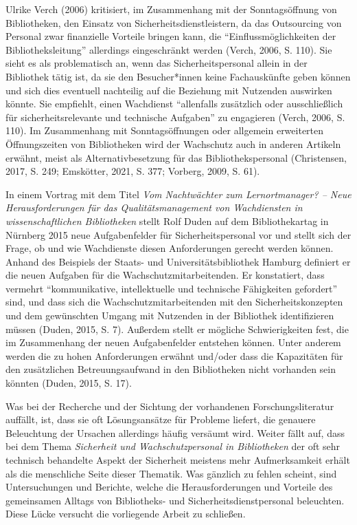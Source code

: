 \documentclass[a4paper,
fontsize=11pt,
oneside,
numbers=noperiodatend,
parskip=half-,
bibliography=totoc,
final
]{scrartcl}
\begin{document}
Ulrike Verch (2006) kritisiert, im Zusammenhang mit der Sonntagsöffnung
von Bibliotheken, den Einsatz von Sicherheitsdienstleistern, da das
Outsourcing von Personal zwar finanzielle Vorteile bringen kann, die
\enquote{Einflussmöglichkeiten der Bibliotheksleitung} allerdings
eingeschränkt werden (Verch, 2006, S. 110). Sie sieht es als
problematisch an, wenn das Sicherheitspersonal allein in der Bibliothek
tätig ist, da sie den Besucher*innen keine Fachauskünfte geben können
und sich dies eventuell nachteilig auf die Beziehung mit Nutzenden
auswirken könnte. Sie empfiehlt, einen Wachdienst \enquote{allenfalls
zusätzlich oder ausschließlich für sicherheitsrelevante und technische
Aufgaben} zu engagieren (Verch, 2006, S. 110). Im Zusammenhang mit
Sonntagsöffnungen oder allgemein erweiterten Öffnungszeiten von
Bibliotheken wird der Wachschutz auch in anderen Artikeln erwähnt, meist
als Alternativbesetzung für das Bibliothekspersonal (Christensen, 2017,
S. 249; Emskötter, 2021, S. 377; Vorberg, 2009, S. 61).

In einem Vortrag mit dem Titel \emph{Vom Nachtwächter zum
Lernortmanager? -- Neue Herausforderungen für das Qualitätsmanagement
von Wachdiensten in wissenschaftlichen Bibliotheken} stellt Rolf Duden
auf dem Bibliothekartag in Nürnberg 2015 neue Aufgabenfelder für
Sicherheitspersonal vor und stellt sich der Frage, ob und wie
Wachdienste diesen Anforderungen gerecht werden können. Anhand des
Beispiels der Staats- und Universitätsbibliothek Hamburg definiert er
die neuen Aufgaben für die Wachschutzmitarbeitenden. Er konstatiert,
dass vermehrt \enquote{kommunikative, intellektuelle und technische
Fähigkeiten gefordert} sind, und dass sich die Wachschutzmitarbeitenden
mit den Sicherheitskonzepten und dem gewünschten Umgang mit Nutzenden in
der Bibliothek identifizieren müssen (Duden, 2015, S. 7). Außerdem
stellt er mögliche Schwierigkeiten fest, die im Zusammenhang der neuen
Aufgabenfelder entstehen können. Unter anderem werden die zu hohen
Anforderungen erwähnt und/oder dass die Kapazitäten für den zusätzlichen
Betreuungsaufwand in den Bibliotheken nicht vorhanden sein könnten
(Duden, 2015, S. 17).

Was bei der Recherche und der Sichtung der vorhandenen
Forschungsliteratur auffällt, ist, dass sie oft Lösungsansätze für
Probleme liefert, die genauere Beleuchtung der Ursachen allerdings
häufig versäumt wird. Weiter fällt auf, dass bei dem Thema
\emph{Sicherheit und Wachschutzpersonal in Bibliotheken} der oft sehr
technisch behandelte Aspekt der Sicherheit meistens mehr Aufmerksamkeit
erhält als die menschliche Seite dieser Thematik. Was gänzlich zu fehlen
scheint, sind Untersuchungen und Berichte, welche die Herausforderungen
und Vorteile des gemeinsamen Alltags von Bibliotheks- und
Sicherheitsdienstpersonal beleuchten. Diese Lücke versucht die
vorliegende Arbeit zu schließen.
\end{document}
